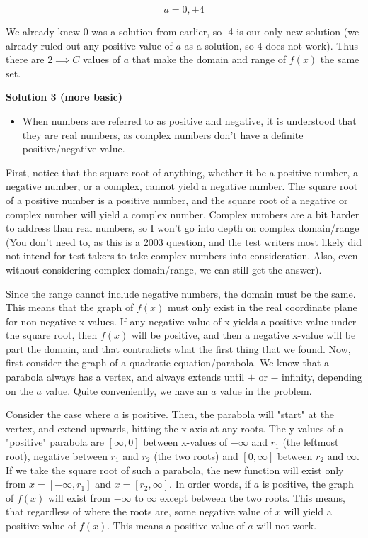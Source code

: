 \begin{enumerate}
 \[a=0,\pm 4\]

 We already knew 0 was a solution from earlier, so -4 is our only new solution (we already ruled out any positive value of $a$ as a solution, so 4 does not work). Thus there are $\boxed {2\implies C}$ values of $a$ that make the domain and range of $f(x)$ the same set.

 



\textbf{Solution 3 (more basic)}


            \begin{itemize}
        \item When numbers are referred to as positive and negative, it is understood that they are real numbers, as complex numbers don't have a definite positive/negative value.
            \end{itemize}
            First, notice that the square root of anything, whether it be a positive number, a negative number, or a complex, cannot yield a negative number. The square root of a positive number is a positive number, and the square root of a negative or complex number will yield a complex number. Complex numbers are a bit harder to address than real numbers, so I won't go into depth on complex domain/range (You don't need to, as this is a 2003 question, and the test writers most likely did not intend for test takers to take complex numbers into consideration. Also, even without considering complex domain/range, we can still get the answer).

 Since the range cannot include negative numbers, the domain must be the same. This means that the graph of $f(x)$ must only exist in the real coordinate plane for non-negative x-values. If any negative value of x yields a positive value under the square root, then $f(x)$ will be positive, and then a negative x-value will be part the domain, and that contradicts what the first thing that we found. Now, first consider the graph of a quadratic equation/parabola. We know that a parabola always has a vertex, and always extends until $+$ or $-$ infinity, depending on the $a$ value. Quite conveniently, we have an $a$ value in the problem.

 Consider the case where $a$ is positive. Then, the parabola will "start" at the vertex, and extend upwards, hitting the x-axis at any roots. The y-values of a "positive" parabola are $[\infty, 0]$ between x-values of $-\infty$ and $r_1$ (the leftmost root), negative between $r_1$ and $r_2$ (the two roots) and $[0, \infty]$ between $r_2$ and $\infty$. If we take the square root of such a parabola, the new function will exist only from $x=[-\infty, r_1]$ and $x=[r_2, \infty]$. In order words, if $a$ is positive, the graph of $f(x)$ will exist from $-\infty$ to $\infty$ except between the two roots. This means, that regardless of where the roots are, some negative value of $x$ will yield a positive value of $f(x)$. This means a positive value of $a$ will not work.


\end{enumerate}
